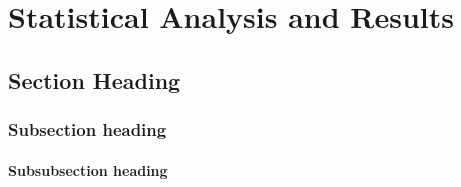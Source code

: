

\chapter{Statistical Analysis and Results}

\section{Section Heading}

\subsection{Subsection heading}

\subsubsection{Subsubsection heading}

